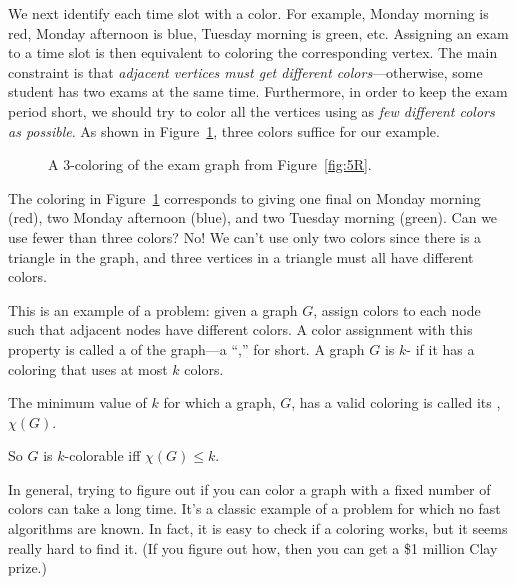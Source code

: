 We next identify each time slot with a color.  For example, Monday
morning is red, Monday afternoon is blue, Tuesday morning is green,
etc.  Assigning an exam to a time slot is then equivalent to coloring
the corresponding vertex.  The main constraint is that \emph{adjacent
  vertices must get different colors}---otherwise, some student has
two exams at the same time.  Furthermore, in order to keep the exam
period short, we should try to color all the vertices using as
\emph{few different colors as possible}.  As shown in Figure~\ref{fig:5S},
three colors suffice for our example.

\begin{figure}


\caption{A 3-coloring of the exam graph from Figure~\ref{fig:5R}.}

\label{fig:5S}

\end{figure}

The coloring in Figure~\ref{fig:5S} corresponds to giving one final on
Monday morning (red), two Monday afternoon (blue), and two Tuesday
morning (green).  Can we use fewer than three colors?  No! We can't
use only two colors since there is a triangle in the graph, and three
vertices in a triangle must all have different colors.

This is an example of a  problem:
 given a graph $G$, assign colors to each
node such that adjacent nodes have different colors.  A color assignment
with this property is called a   of the graph---a ``,'' for short.  A graph $G$
is $k$- if it has a coloring that uses at most $k$ colors.
\begin{definition}
  The minimum value of $k$ for which a graph, $G$, has a valid coloring is
  called its , $\chi(G)$.
\end{definition}
\begin{editingnotes}
\end{editingnotes}
So $G$ is $k$-colorable iff $\chi(G) \leq k$.

In general, trying to figure out if you can color a graph with a fixed
number of colors can take a long time.  It's a classic example of a
problem for which no fast algorithms are known.  In fact, it is easy to
check if a coloring works, but it seems really hard to find it. (If you
figure out how, then you can get a \$1 million Clay prize.)


